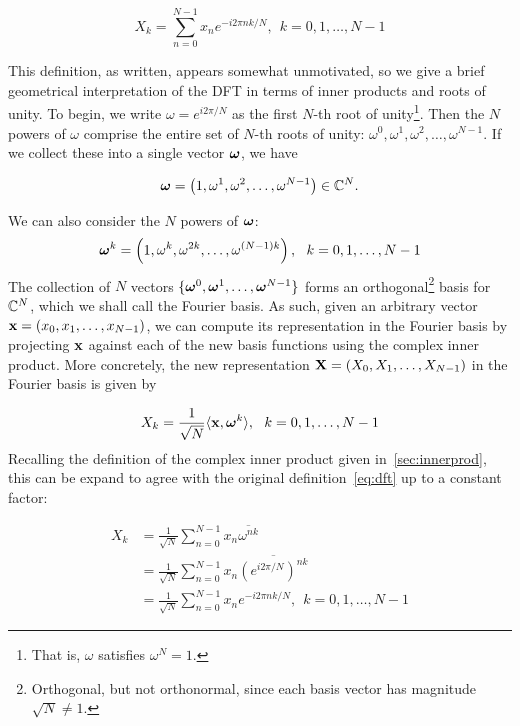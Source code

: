 \begin{equation}
\label{eq:dft}
	X_k = \sum_{n=0}^{N-1}x_n e^{-i2\pi n k/N}, \ \ k = 0, 1, \dots, N-1
\end{equation}

This definition, as written, appears somewhat unmotivated, so we give a brief geometrical interpretation of the DFT in terms of inner products and roots of unity. 
To begin, we write $\omega = e^{i2 \pi / N}$ as the first $N$-th root of unity\footnote{That is, $\omega$ satisfies $\omega^N = 1$.}. Then the $N$ powers of $\omega$ comprise the entire set of $N$-th roots of unity: $\omega^0, \omega^1, \omega^2, \dots, \omega^{N-1}$. If we collect these into a single vector $\boldsymbol{\omega}$, we have 

\begin{equation}
	\boldsymbol{\omega} = \left(1, \omega^1, \omega^2, \dots, \omega^{N-1}\right) \in \mathbb{C}^N. 
\end{equation}

We can also consider the $N$ powers of $\boldsymbol{\omega}$:
\begin{equation}
	\boldsymbol{\omega}^k = \left(1, \omega^k, \omega^{2k}, \dots, \omega^{(N-1)k}\right), \ \ k = 0, 1, \dots, N-1
\end{equation}
The collection of $N$ vectors $\{\boldsymbol{\omega}^0, \boldsymbol{\omega}^1, \dots, \boldsymbol{\omega}^{N-1}\}$ forms an orthogonal\footnote{Orthogonal, but not orthonormal, since each basis vector has magnitude $\sqrt{N} \neq 1$.} basis for $\mathbb{C}^N$, which we shall call the Fourier basis. As such, given an arbitrary vector $\mathbf{x} = \left(x_0, x_1, \dots, x_{N-1}\right)$, we can compute its representation in the Fourier basis by projecting $\mathbf{x}$ against each of the new basis functions using the complex inner product. More concretely, the new representation $\mathbf{X} = \left(X_0, X_1, \dots, X_{N-1}\right)$ in the Fourier basis is given by 

\begin{equation}
	X_k = \frac{1}{\sqrt{N}} \langle \mathbf{x}, \boldsymbol{\omega}^k \rangle, \ \ k = 0, 1, \dots, N-1
\end{equation}
Recalling the definition of the complex inner product given in~\ref{sec:innerprod}, this can be expand to agree with the original definition~\ref{eq:dft} up to a constant factor:

\begin{align}
	X_k &= \frac{1}{\sqrt{N}}\sum_{n=0}^{N-1}x_n \overline{\omega^{nk}}\\
	        &= \frac{1}{\sqrt{N}}\sum_{n=0}^{N-1}x_n \overline{\left(e^{i 2 \pi / N}\right)^{nk}}\\
	        &= \frac{1}{\sqrt{N}}\sum_{n=0}^{N-1}x_n e^{-i2\pi n k/N}, \ \ k = 0, 1, \dots, N-1
\end{align}

